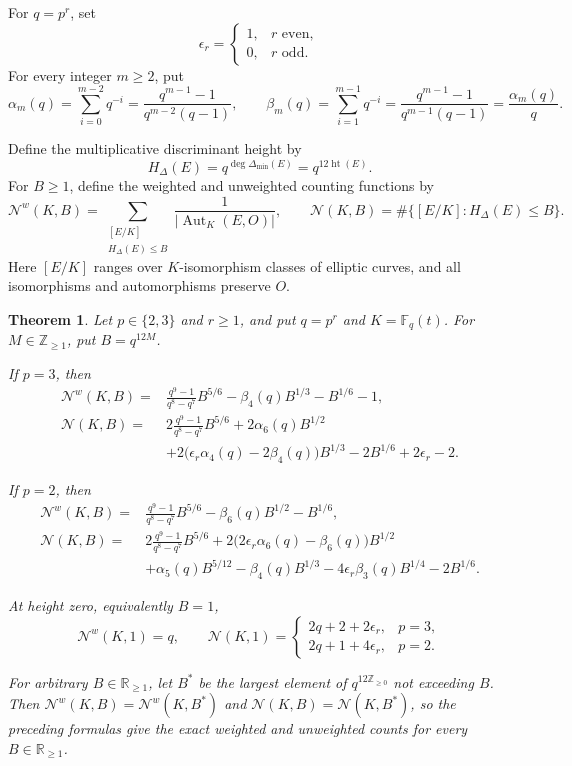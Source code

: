 \documentclass[a4paper,12pt]{amsart}
\newtheorem{thm}{Theorem}[section]
\theoremstyle{definition}
\newcommand{\Zb}{\mathbb{Z}}
\newcommand{\Fb}{\mathbb{F}}
\DeclareMathOperator{\height}{ht}
\newcommand{\Nc}{\mathcal{N}}
\newcommand{\Rb}{\mathbb{R}}
\newcommand{\Aut}{\operatorname{Aut}}
\begin{document}
\medskip

For $q=p^r$, set
\begin{equation}\label{eq:parity-indicator}
\epsilon_r=
\begin{cases}
1,&r\text{ even},\\
0,&r\text{ odd}.
\end{cases}
\end{equation}
For every integer $m\geq2$, put
\begin{equation}\label{eq:alpha-beta}
\alpha_m(q)=\sum_{i=0}^{m-2}q^{-i}=\frac{q^{m-1}-1}{q^{m-2}(q-1)},
\qquad
\beta_m(q)=\sum_{i=1}^{m-1}q^{-i}=\frac{q^{m-1}-1}{q^{m-1}(q-1)}=\frac{\alpha_m(q)}{q}.
\end{equation}

\medskip

Define the multiplicative discriminant height by
\[
H_\Delta(E)=q^{\deg\Delta_{\min}(E)}=q^{12\height(E)}.
\]
For $B\geq1$, define the weighted and unweighted counting functions by
\[
\Nc^w(K,B)
=
\sum_{\substack{[E/K]\\ H_\Delta(E)\leq B}}
\frac{1}{|\Aut_K(E,O)|},
\qquad
\Nc(K,B)
=
\#\{[E/K]:H_\Delta(E)\leq B\}.
\]
Here $[E/K]$ ranges over $K$-isomorphism classes of elliptic curves, and all isomorphisms and automorphisms preserve $O$.

\begin{thm}\label{thm:main}
Let $p\in\{2,3\}$ and $r\geq1$, and put $q=p^r$ and $K=\Fb_q(t)$.  For $M\in\Zb_{\geq1}$, put $B=q^{12M}$.

\medskip

If $p=3$, then
\begin{align*}
\Nc^w(K,B)
={}&
\frac{q^9-1}{q^8-q^7}B^{5/6}
-
\beta_4(q)B^{1/3}
-
B^{1/6}
-
1,\\
\Nc(K,B)
={}&
2\frac{q^9-1}{q^8-q^7}B^{5/6}
+
2\alpha_6(q)B^{1/2}\\
&+
2\bigl(
\epsilon_r\alpha_4(q)-2\beta_4(q)
\bigr)B^{1/3}
-
2B^{1/6}
+
2\epsilon_r
-
2.
\end{align*}

If $p=2$, then
\begin{align*}
\Nc^w(K,B)
={}&
\frac{q^9-1}{q^8-q^7}B^{5/6}
-
\beta_6(q)B^{1/2}
-
B^{1/6},\\
\Nc(K,B)
={}&
2\frac{q^9-1}{q^8-q^7}B^{5/6}
+
2\bigl(
2\epsilon_r\alpha_6(q)-\beta_6(q)
\bigr)B^{1/2}\\
&+
\alpha_5(q)B^{5/12}
-
\beta_4(q)B^{1/3}
-
4\epsilon_r\beta_3(q)B^{1/4}
-
2B^{1/6}.
\end{align*}

\medskip

At height zero, equivalently $B=1$,
\[
\Nc^w(K,1)=q,
\qquad
\Nc(K,1)=
\begin{cases}
2q+2+2\epsilon_r,&p=3,\\
2q+1+4\epsilon_r,&p=2.
\end{cases}
\]

For arbitrary $B\in\Rb_{\geq1}$, let $B^\ast$ be the largest element of $q^{12\Zb_{\geq0}}$ not exceeding $B$.  Then $\Nc^w(K,B)=\Nc^w(K,B^\ast)$ and $\Nc(K,B)=\Nc(K,B^\ast)$, so the preceding formulas give the exact weighted and unweighted counts for every $B\in\Rb_{\geq1}$.
\end{thm}
\end{document}
